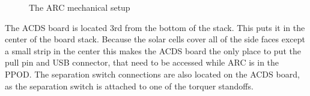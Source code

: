 \begin{figure}[!ht]
    \caption{The \acs*{ARC} mechanical setup}
    \label{fig:arcMech}
\end{figure}

The \ac{ACDS} board is located 3rd from the bottom of the stack. This puts it in the center of the board stack. Because the solar cells cover all of the side faces except a small strip in the center this makes the \ac{ACDS} board the only place to put the pull pin and \ac{USB} connector, that need to be accessed while \ac{ARC} is in the \ac{PPOD}. The separation switch connections are also located on the \ac{ACDS} board, as the separation switch is attached to one of the torquer standoffs.

